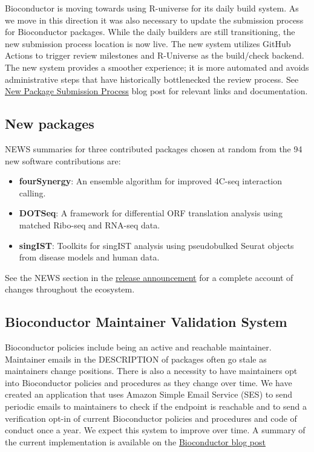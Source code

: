 Bioconductor is moving towards using R-universe for its daily build system. As
we move in this direction it was also necessary to update the submission process
for Bioconductor packages. While the daily builders are still transitioning, the
new submission process location is now live. The new system utilizes GitHub
Actions to trigger review milestones and R-Universe as the build/check
backend. The new system provides a smoother experience; it is more automated and
avoids administrative steps that have historically bottlenecked the review
process. See \href{https://blog.bioconductor.org/posts/2026-06-15-new-submission-process-with-Runiverse/}{New Package Submission
Process}
blog post for relevant links and documentation.

\subsection{New packages}\label{new-packages}

NEWS summaries for three contributed packages chosen at random from the 94 new software contributions are:

\begin{itemize}
\item
  \textbf{fourSynergy}: An ensemble algorithm for improved 4C-seq interaction calling.
\item
  \textbf{DOTSeq}: A framework for differential ORF translation analysis using matched Ribo-seq and RNA-seq data.
\item
  \textbf{singIST}: Toolkits for singIST analysis using pseudobulked Seurat objects from disease models and human data.
\end{itemize}

See the NEWS section in the \href{https://bioconductor.org/news/bioc_3_23_release/}{release announcement} for
a complete account of changes throughout the ecosystem.

\subsection{Bioconductor Maintainer Validation System}\label{bioconductor-maintainer-validation-system}

Bioconductor policies include being an active and reachable
maintainer. Maintainer emails in the DESCRIPTION of packages often go stale as
maintainers change positions. There is also a necessity to have maintainers opt
into Bioconductor policies and procedures as they change over time. We have
created an application that uses Amazon Simple Email Service (SES) to send
periodic emails to maintainers to check if the endpoint is reachable and to send
a verification opt-in of current Bioconductor policies and procedures and code
of conduct once a year. We expect this system to improve over time. A summary of
the current implementation is available on the \href{https://blog.bioconductor.org/posts/2026-06-16-maintainer-validation/}{Bioconductor blog
post}

